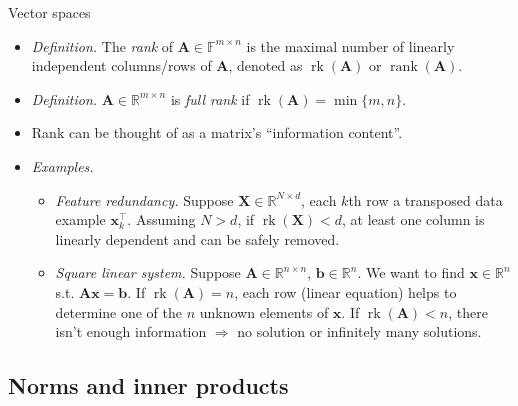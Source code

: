 \documentclass{beamer}
\numberwithin{equation}{section}
\begin{document}
\begin{frame}{Vector spaces}
    \begin{itemize}
        \item
        \textit{Definition.} The \textit{rank} of $ \mathbf{A} \in
        \mathbb{F}^{m \times n} $ is the maximal number of linearly
        independent columns/rows of $ \mathbf{A} $, denoted as
        $ \operatorname{rk}(\mathbf{A}) $ or
        $ \operatorname{rank}(\mathbf{A}) $.

        \item
        \textit{Definition.} $ \mathbf{A} \in \mathbb{R}^{m \times n} $ is
        \textit{full rank} if $ \operatorname{rk}(\mathbf{A}) = \min\{m, n\} $.

        \item
        Rank can be thought of as a matrix's ``information content''.

        \item
        \textit{Examples.}
        \begin{itemize}
            \item
            \textit{Feature redundancy.} Suppose $ \mathbf{X} \in
            \mathbb{R}^{N \times d} $, each $ k $th row a transposed data
            example $ \mathbf{x}_k^\top $. Assuming $ N > d $, if
            $ \operatorname{rk}(\mathbf{X}) < d $, at least one column is
            linearly dependent and can be safely removed.

            \item
            \textit{Square linear system.} Suppose $ \mathbf{A} \in
            \mathbb{R}^{n \times n} $, $ \mathbf{b} \in \mathbb{R}^n $. We
            want to find $ \mathbf{x} \in \mathbb{R}^n $ s.t. $ \mathbf{Ax} =
            \mathbf{b} $. If $ \operatorname{rk}(\mathbf{A}) = n $, each row
            (linear equation) helps to determine one of the $ n $ unknown
            elements of $ \mathbf{x} $. If
            $ \operatorname{rk}(\mathbf{A}) < n $, there isn't enough
            information $ \Rightarrow  $ no solution or infinitely many
            solutions.
        \end{itemize}
    \end{itemize}
\end{frame}

\subsection{Norms and inner products}
\end{document}
